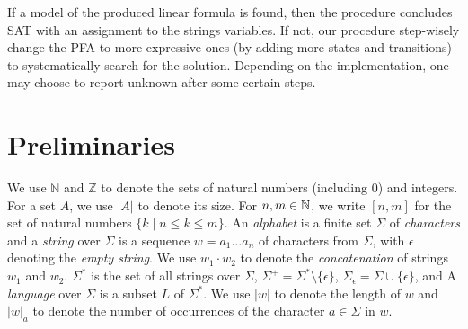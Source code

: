 \documentclass[sigplan,review,anonymous]{acmart}\settopmatter{printfolios=true,printccs=false,printacmref=false}
\begin{document}
If a model of the produced linear formula is found, then the procedure concludes SAT with an assignment to the strings variables.  If not, our procedure step-wisely change the PFA to more expressive ones (by adding more states and transitions) to systematically search for the solution. Depending on the implementation, one may choose to report unknown after some certain steps.




\section{Preliminaries} \label{section:preliminary}
%


We use $\mathbb{N}$ and $\mathbb{Z}$ to denote the sets of natural numbers (including 0) and 
integers. For a set $A$, we use $|A|$ to denote its size. 
For $n,m\in\mathbb{N}$, we write $[n,m]$ for the set of natural numbers 
$\{k\mid n\leq k \leq m\}$. 
An \emph{alphabet} is a finite set $\Sigma$ of \emph{characters} and a \emph{string} over $\Sigma$ is a sequence $w = a_1\ldots a_n$ of characters from $\Sigma$, with $\epsilon$ denoting the \emph{empty string}. 
We use $w_1\cdot w_2$ to denote the \emph{concatenation} of strings $w_1$ and $w_2$.
$\Sigma^*$ is the set of all strings over $\Sigma$, $\Sigma^+ = \Sigma^*\setminus \{\epsilon\}$, $\Sigma_\epsilon = \Sigma\cup\{\epsilon\}$, and 
A \emph{language} over $\Sigma$ is a subset $L$ of $\Sigma^*$.  
%
We use $|w|$ to denote the length of $w$ and $|w|_a$ to denote the number of occurrences of the character $a\in \Sigma$ in $w$.  
\end{document}
